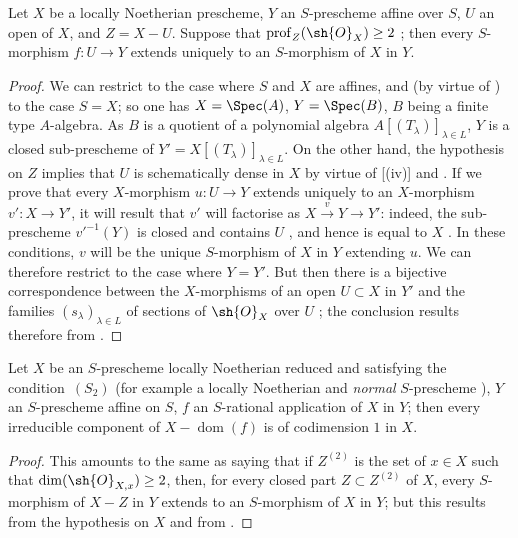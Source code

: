 \begin{proposition}[20.4.11]
\label{IV.20.4.11}
Let $X$ be a locally Noetherian prescheme, $Y$ an $S$-prescheme affine over $S$, $U$ an open of $X$, and $Z=X-U$.
Suppose that $\operatorname{prof}_Z(\sh{O}_X)\geq 2$ ;
then every $S$-morphism $f:U\to Y$ extends uniquely to an $S$-morphism of $X$ in $Y$.
\end{proposition}

\begin{proof}
We can restrict to the case where $S$ and $X$ are affines, and (by virtue of ) to the case $S=X$;
so one has $X=\Spec(A)$, $Y=\Spec(B)$, $B$ being a finite type $A$-algebra.
As $B$ is a quotient of a polynomial algebra $A[(T_\lambda)]_{\lambda\in L}$, $Y$ is a closed sub-prescheme of $Y'=X[(T_\lambda)]_{\lambda\in L}$.
On the other hand, the hypothesis on $Z$ implies that $U$ is schematically dense in $X$ by virtue of [(iv)] and .
If we prove that every $X$-morphism $u:U\to Y$ extends uniquely to an $X$-morphism $v':X\to Y'$, it will result that $v'$ will factorise as $X\xrightarrow{v}Y\to Y'$:
indeed, the sub-prescheme $v'^{-1}(Y)$ is closed and contains $U$ , and hence is equal to $X$ .
In these conditions, $v$ will be the unique $S$-morphism of $X$ in $Y$ extending $u$.
We can therefore restrict to the case where $Y=Y'$.
But then there is a bijective correspondence between the $X$-morphisms of an open $U\subset X$ in $Y'$ and the families $(s_\lambda)_{\lambda\in L}$ of sections of $\sh{O}_X$ over $U$ ;
the conclusion results therefore from .
\end{proof}

\begin{corollary}[20.4.12]
\label{IV.20.4.12}
Let $X$ be an $S$-prescheme locally Noetherian reduced and satisfying the condition~$(S_2)$  (for example a locally Noetherian and \emph{normal} $S$-prescheme ), $Y$ an $S$-prescheme affine on $S$, $f$ an $S$-rational application of $X$ in $Y$;
then every irreducible component of $X-\operatorname{dom}(f)$ is of codimension $1$ in $X$.
\end{corollary}

\begin{proof}
This amounts to the same as saying that if $Z^{(2)}$ is the set of $x\in X$ such that $\dim(\sh{O}_{X,x})\geq 2$, then, for every closed part $Z\subset Z^{(2)}$ of $X$, every $S$-morphism of $X-Z$ in $Y$ extends to an $S$-morphism of $X$ in $Y$;
but this results from the hypothesis on $X$  and from .
\end{proof}

